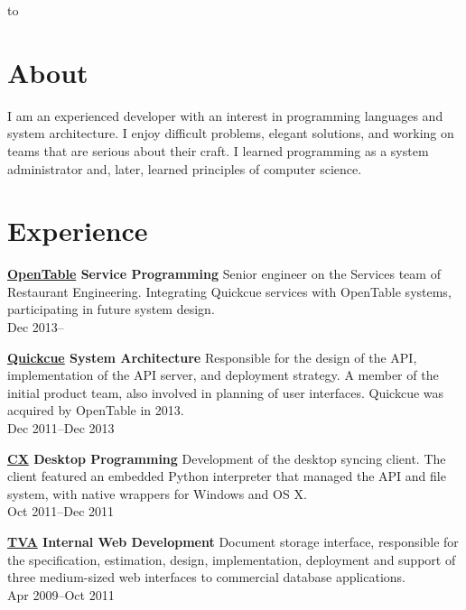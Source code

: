 \documentclass[margin]{res}
\begin{document}

\hbox to 

\begin{resume}
\section{About}

I am an experienced developer with an interest in programming
languages and system architecture. I enjoy difficult problems, elegant
solutions, and working on teams that are serious about their craft. I
learned programming as a system administrator and, later, learned
principles of computer science.

\section{Experience}

{\bf \href{https://opentable.com/}{OpenTable} Service Programming}
%
Senior engineer on the Services team of Restaurant Engineering.
Integrating Quickcue services with OpenTable systems, participating in
future system design.\\
%
Dec 2013--

{\bf \href{https://quickcue.com/}{Quickcue} System Architecture}
%
Responsible for the design of the API, implementation of the API
server, and deployment strategy. A member of the initial product team,
also involved in planning of user interfaces. Quickcue was acquired by
OpenTable in 2013.\\
%
Dec 2011--Dec 2013

{\bf \href{https://www.cx.com/}{CX} Desktop Programming}
%
Development of the desktop syncing client. The client featured an
embedded Python interpreter that managed the API and file system, with
native wrappers for Windows and OS X.\\
%
Oct 2011--Dec 2011

{\bf \href{http://tva.gov/}{TVA} Internal Web Development}
%
Document storage interface, responsible for the specification,
estimation, design, implementation, deployment and support of three
medium-sized web interfaces to commercial database applications.\\
%
Apr 2009--Oct 2011


\end{resume}
\end{document}
